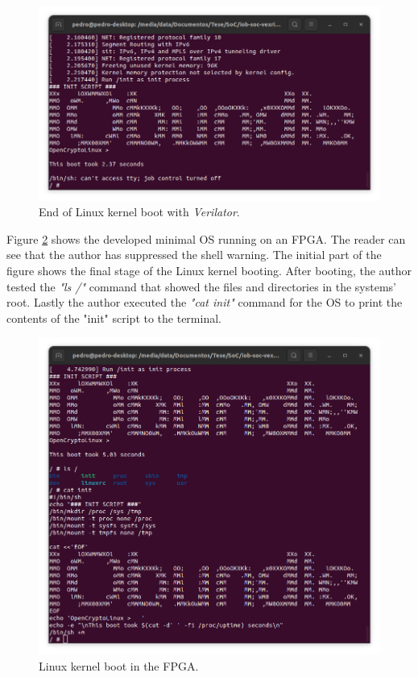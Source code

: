 \begin{figure}[!ht]
    \centering
    \includegraphics[width=\linewidth]{../images/end_Linux_sim.png}
    \caption{End of Linux kernel boot with \textit{Verilator}.}
    \label{fig:end_linux_verilator}
\end{figure}

Figure \ref{fig:linux_fpga} shows the developed minimal OS running on an FPGA. The reader can see that the author has suppressed the shell warning. The initial part of the figure shows the final stage of the Linux kernel booting. After booting, the author tested the \textit{"ls /"} command that showed the files and directories in the systems' root. Lastly the author executed the \textit{"cat init"} command for the OS to print the contents of the "init" script to the terminal.

\begin{figure}[!ht]
    \centering
    \includegraphics[width=\linewidth]{../images/linux_fpga.png}
    \caption{Linux kernel boot in the FPGA.}
    \label{fig:linux_fpga}
\end{figure}

